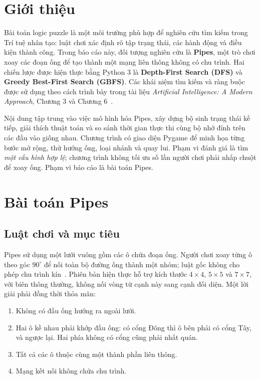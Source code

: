 \section{Giới thiệu}

Bài toán logic puzzle là một môi trường phù hợp để nghiên cứu tìm kiếm trong
Trí tuệ nhân tạo: luật chơi xác định rõ tập trạng thái, các hành động và điều
kiện thành công. Trong báo cáo này, đối tượng nghiên cứu là \textbf{Pipes}, một
trò chơi xoay các đoạn ống để tạo thành một mạng liên thông không có chu trình.
Hai chiến lược được hiện thực bằng Python 3 là \textbf{Depth-First Search (DFS)}
và \textbf{Greedy Best-First Search (GBFS)}. Các khái niệm tìm kiếm và ràng buộc
được sử dụng theo cách trình bày trong tài liệu \emph{Artificial Intelligence:
A Modern Approach}, Chương 3 và Chương 6~\cite{aima}.

Nội dung tập trung vào việc mô hình hóa Pipes, xây dựng bộ sinh trạng thái kế
tiếp, giải thích thuật toán và so sánh thời gian thực thi cùng bộ nhớ đỉnh trên
các đầu vào giống nhau. Chương trình có giao diện Pygame để minh họa từng bước
mở rộng, thử hướng ống, loại nhánh và quay lui. Phạm vi đánh giá là tìm
\emph{một cấu hình hợp lệ}; chương trình không tối ưu số lần người chơi phải
nhấp chuột để xoay ống. Phạm vi báo cáo là bài toán Pipes.

\section{Bài toán Pipes}
\subsection{Luật chơi và mục tiêu}

Pipes sử dụng một lưới vuông gồm các ô chứa đoạn ống. Người chơi xoay từng ô
theo góc $90^\circ$ để nối toàn bộ đường ống thành một nhóm; luật gốc không cho
phép chu trình kín~\cite{pipes}. Phiên bản hiện thực hỗ trợ kích thước
$4\times4$, $5\times5$ và $7\times7$, với biên thông thường, không nối vòng
từ cạnh này sang cạnh đối diện. Một lời giải phải đồng thời thỏa mãn:
\begin{enumerate}
\item Không có đầu ống hướng ra ngoài lưới.
\item Hai ô kề nhau phải khớp đầu ống: có cổng Đông thì ô bên phải có cổng Tây,
      và ngược lại. Hai phía không có cổng cũng phải nhất quán.
\item Tất cả các ô thuộc cùng một thành phần liên thông.
\item Mạng kết nối không chứa chu trình.
\end{enumerate}

